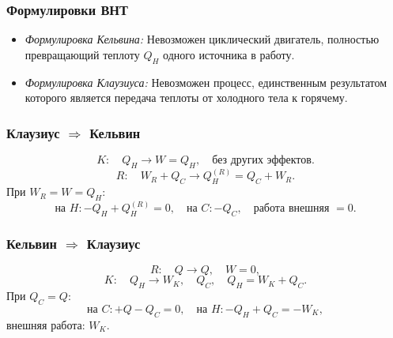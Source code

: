 \documentclass[12pt, a4paper]{article}
\begin{document}
\subsubsection*{Формулировки ВНТ}

\begin{itemize}
  \item \textit{Формулировка Кельвина:} Невозможен циклический двигатель, полностью превращающий теплоту $Q_H$ одного источника в работу.
  \item \textit{Формулировка Клаузиуса:} Невозможен процесс, единственным результатом которого является передача теплоты от холодного тела к горячему.
\end{itemize}

\subsubsection*{Клаузиус $\Rightarrow$ Кельвин}

\[
K:\quad Q_H \to W=Q_H, \quad \text{без других эффектов.}
\]
\[
R:\quad W_R + Q_C \to Q_H^{(R)} = Q_C + W_R.
\]
При $W_R = W = Q_H$:
\[
\text{на } H: -Q_H + Q_H^{(R)} = 0, \quad \text{на } C: -Q_C, \quad \text{работа внешняя }=0.
\]

\subsubsection*{Кельвин $\Rightarrow$ Клаузиус}

\[
R:\quad Q \to Q, \quad W=0,
\]
\[
K:\quad Q_H \to W_K, \quad Q_C, \quad Q_H = W_K + Q_C.
\]
При $Q_C = Q$:
\[
\text{на } C: +Q - Q_C = 0, \quad \text{на } H: -Q_H + Q_C = -W_K,
\]
внешняя работа: $W_K$.
\end{document}
